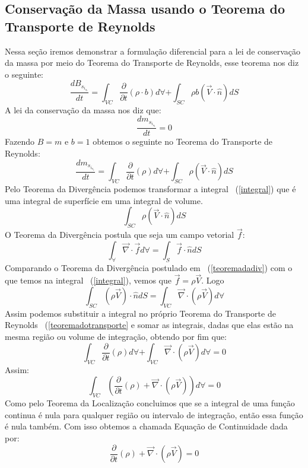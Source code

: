 \documentclass[12pt,a4paper]{article}
\begin{document}
\subsection{Conservação da Massa usando o Teorema do Transporte de Reynolds}
Nessa seção iremos demonstrar a formulação diferencial para a lei de conservação da massa por meio do Teorema do Transporte de Reynolds, esse teorema nos diz o seguinte:
\begin{equation}
    \dfrac{dB_s_i_s_t}{dt} = \int_{VC}\frac{\partial}{\partial t}(\rho \cdot b) d\forall + \int_{SC}\rho b(\Vec{V} \cdot \widehat{n})dS
\end{equation}
A lei da conservação da massa nos diz que: 
\begin{equation}
    \dfrac{dm_s_i_s_t}{dt} = 0
\end{equation}
Fazendo $B = m$ e $b = 1$ obtemos o seguinte no Teorema do Transporte de Reynolds:
\begin{equation}
    \dfrac{dm_s_i_s_t}{dt} = \int_{VC}\frac{\partial}{\partial t}(\rho)d\forall + \int_{SC}\rho(\Vec{V} \cdot \widehat{n})dS
    \label{teoremadotransporte}
\end{equation}
Pelo Teorema da Divergência podemos transformar a integral ~(\ref{integral}) que é uma integral de superfície em uma integral de volume. 
\begin{equation}
    \int_{SC}\rho(\Vec{V} \cdot \widehat{n})dS
    \label{integral}
\end{equation}
O Teorema da Divergência postula que seja um campo vetorial $\Vec{f}$: 
\begin{equation}
    \int_{\forall}\Vec{\nabla}\cdot \Vec{f}d\forall = \int_{S}\Vec{f}\cdot\widehat{n}dS
    \label{teoremadadiv}
\end{equation}
Comparando o Teorema da Divergência postulado em ~(\ref{teoremadadiv}) com o que temos na integral ~(\ref{integral}), vemos que $\Vec{f} = \rho\Vec{V}$. Logo
\begin{equation}
    \int_{SC}(\rho\Vec{V})\cdot\widehat{n}dS = \int_{VC}\Vec{\nabla}\cdot(\rho\Vec{V})d\forall
\end{equation}
Assim podemos substituir a integral no próprio Teorema do Transporte de Reynolds ~(\ref{teoremadotransporte} e somar as integrais, dadas que elas estão na mesma região ou volume de integração, obtendo por fim que:
\begin{equation}
    \int_{VC}\frac{\partial}{\partial t}(\rho)d\forall + \int_{VC}\Vec{\nabla}\cdot(\rho\Vec{V})d\forall = 0
\end{equation}
Assim:
\begin{equation}
    \int_{VC}\left(\frac{\partial}{\partial t}(\rho)+ \Vec{\nabla}\cdot(\rho\Vec{V})\right)d\forall = 0
\end{equation}
Como pelo Teorema da Localização concluimos que se a integral de uma função continua é nula para qualquer região ou intervalo de integração, então essa função é nula também. Com isso obtemos a chamada Equação de Continuidade dada por:
\begin{equation}
    \frac{\partial}{\partial t}(\rho)+ \Vec{\nabla}\cdot(\rho\Vec{V}) = 0
\end{equation}
\end{document}
